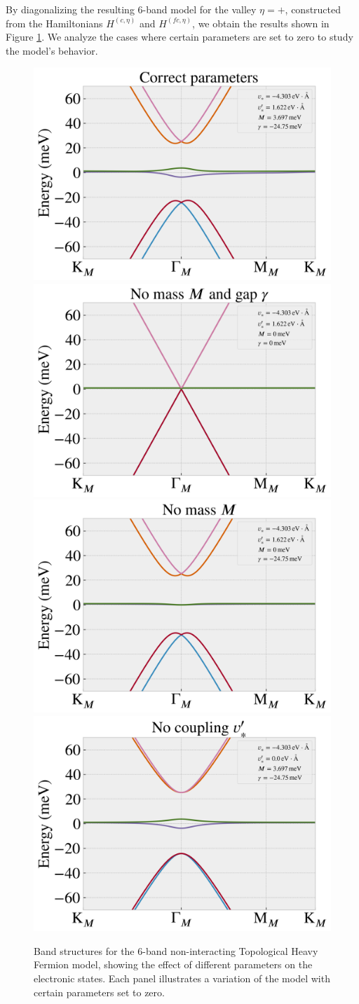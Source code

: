 By diagonalizing the resulting 6-band model for the valley $\eta = +$, constructed from the Hamiltonians $H^{(c,\eta)}$ and $H^{(fc,\eta)}$, we obtain the results shown in Figure \ref{fig:thf-exploration}. We analyze the cases where certain parameters are set to zero to study the model's behavior.

\begin{figure}[H]
\centering
\includegraphics[height=0.35\linewidth]{fig/thf-correct_params.png}
\includegraphics[height=0.35\linewidth]{fig/thf-no_M_no_gamma.png}
\includegraphics[height=0.35\linewidth]{fig/thf-no_M.png}
\includegraphics[height=0.35\linewidth]{fig/thf-no_coupling.png}
\caption{Band structures for the 6-band non-interacting Topological Heavy Fermion model, showing the effect of different parameters on the electronic states. Each panel illustrates a variation of the model with certain parameters set to zero.}
\label{fig:thf-exploration}
\end{figure}

